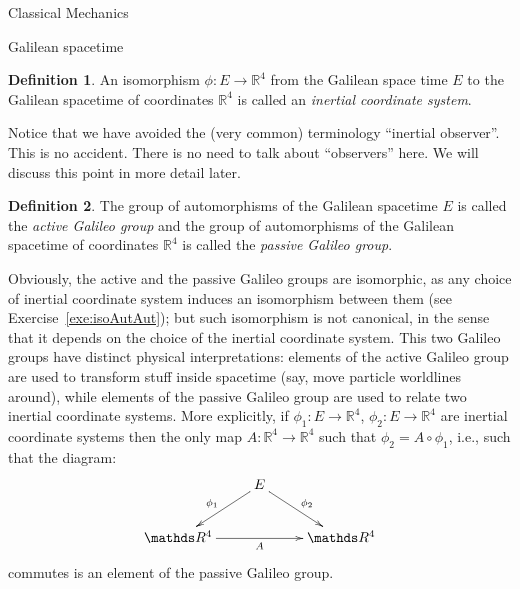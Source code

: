\documentclass[oneside,a4paper,11pt]{amsbook}
\newcommand{\R}{\mathds R}
\theoremstyle{remark}\newtheorem{exercise}{Exercise}[chapter]
\theoremstyle{plain}\newtheorem{teo}{Theorem}[section]
\theoremstyle{plain}\newtheorem{lem}[teo]{Lemma}
\theoremstyle{plain}\newtheorem{prop}[teo]{Proposition}
\theoremstyle{plain}\newtheorem{cor}[teo]{Corollary}
\theoremstyle{definition}\newtheorem{defin}[teo]{Definition}
\theoremstyle{remark}\newtheorem{rem}[teo]{Remark}
\theoremstyle{definition}\newtheorem{notation}[teo]{Notation}
\theoremstyle{definition}\newtheorem{convention}[teo]{Convention}
\theoremstyle{definition}\newtheorem{example}[teo]{Example}
\numberwithin{section}{chapter}
\numberwithin{equation}{section}
\begin{document}
\begin{chapter}{Classical Mechanics}
\begin{section}{Galilean spacetime}
\begin{defin}
An isomorphism $\phi:E\to\R^4$ from the Galilean space time $E$ to the Galilean spacetime
of coordinates $\R^4$ is called an {\em inertial coordinate system}.
\end{defin}
Notice that we have avoided the (very common) terminology ``inertial observer''. This is no accident.
There is no need to talk about ``observers'' here. We will discuss this point in more detail later.

\begin{defin}
The group of automorphisms of the Galilean spacetime $E$ is called the {\em active Galileo group\/} and the
group of automorphisms of the Galilean spacetime of coordinates $\R^4$ is called the {\em passive Galileo group}.
\end{defin}
Obviously, the active and the passive Galileo groups are isomorphic, as any choice of inertial coordinate system
induces an isomorphism between them (see Exercise~\ref{exe:isoAutAut}); but such isomorphism is not canonical, in the
sense that it depends on the choice of the inertial coordinate system.
This two Galileo groups have distinct physical interpretations: elements of the active Galileo group are used to
transform stuff inside spacetime (say, move particle worldlines around), while elements of the passive Galileo
group are used to relate two inertial coordinate systems. More explicitly, if $\phi_1:E\to\R^4$, $\phi_2:E\to\R^4$
are inertial coordinate systems then the only map $A:\R^4\to\R^4$ such that $\phi_2=A\circ\phi_1$, i.e.,
such that the diagram:
\begin{equation}\label{eq:phi1phi2A}
\vcenter{\xymatrix{%
&E\ar[ld]_{\phi_1}\ar[rd]^{\phi_2}\\
\R^4\ar[rr]_A&&\R^4}}
\end{equation}
commutes is an element of the passive Galileo group.


\end{section}
\end{chapter}
\end{document}
